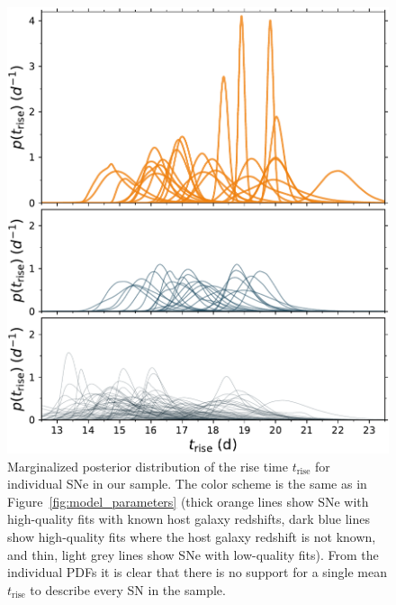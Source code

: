 \documentclass[twocolumn]{aastex63}
\begin{document}
\begin{figure}
    \centering
    \includegraphics[width=1\linewidth]{./figures/rise_time.pdf}
    \caption{Marginalized posterior distribution of the rise time
    $t_\mathrm{rise}$ for individual SNe in our sample. The color scheme is
    the same as in Figure~\ref{fig:model_parameters} (thick orange lines show
    SNe with high-quality fits with known host galaxy redshifts, dark blue
    lines show high-quality fits where the host galaxy redshift is not known,
    and thin, light grey lines show SNe with low-quality fits). From the
    individual PDFs it is clear that there is no support for a single mean
    $t_\mathrm{rise}$ to describe every SN in the sample.}
    \label{fig:rise_time}
\end{figure}
\end{document}
